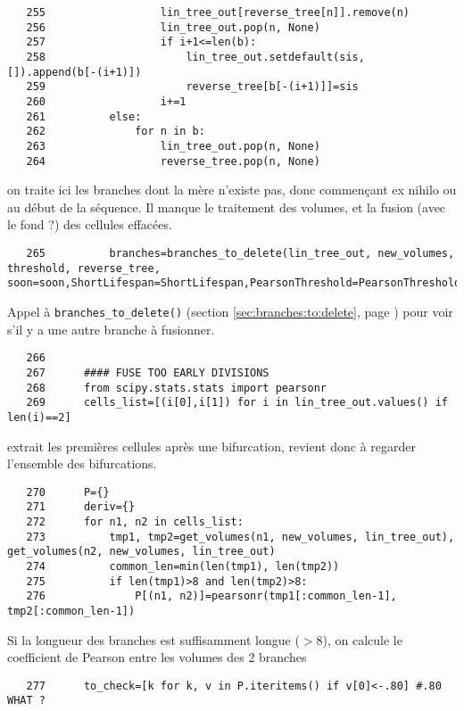 \documentclass{article}
\def \mycolor {red}
\begin{document}
\color{black}
\begin{verbatim}
   255	                lin_tree_out[reverse_tree[n]].remove(n)
   256	                lin_tree_out.pop(n, None)
   257	                if i+1<=len(b):
   258	                    lin_tree_out.setdefault(sis, []).append(b[-(i+1)])
   259	                    reverse_tree[b[-(i+1)]]=sis
   260	                i+=1
   261	        else:
   262	            for n in b:
   263	                lin_tree_out.pop(n, None)
   264	                reverse_tree.pop(n, None)
\end{verbatim} 
\color{\mycolor}
on traite ici les branches dont la m\`ere n'existe pas, donc commen\c{c}ant ex nihilo ou au d\'ebut de la s\'equence. Il manque le traitement des volumes, et la fusion (avec le fond ?) des cellules effac\'ees.
\color{black}
\begin{verbatim}
   265	        branches=branches_to_delete(lin_tree_out, new_volumes, threshold, reverse_tree, soon=soon,ShortLifespan=ShortLifespan,PearsonThreshold=PearsonThreshold,time_begin=time_begin,time_end=time_end)
\end{verbatim} 
\color{\mycolor}
Appel \`a \texttt{branches\_to\_delete()}
(section \ref{sec:branches:to:delete}, page \pageref{sec:branches:to:delete}) pour voir s'il y a une autre branche \`a fusionner.
\color{black}
\begin{verbatim}
   266	
   267	    #### FUSE TOO EARLY DIVISIONS
   268	    from scipy.stats.stats import pearsonr
   269	    cells_list=[(i[0],i[1]) for i in lin_tree_out.values() if len(i)==2]
\end{verbatim} 
\color{\mycolor}
extrait les premi\`eres cellules apr\`es une bifurcation, revient donc \`a regarder l'ensemble des bifurcations.
\color{black}
\begin{verbatim}
   270	    P={}
   271	    deriv={}
   272	    for n1, n2 in cells_list:
   273	        tmp1, tmp2=get_volumes(n1, new_volumes, lin_tree_out), get_volumes(n2, new_volumes, lin_tree_out)
   274	        common_len=min(len(tmp1), len(tmp2))
   275	        if len(tmp1)>8 and len(tmp2)>8: 
   276	            P[(n1, n2)]=pearsonr(tmp1[:common_len-1], tmp2[:common_len-1])
\end{verbatim} 
\color{\mycolor}
Si la longueur des branches est suffisamment longue ($>8$), on calcule le coefficient de Pearson entre les volumes des 2 branches 
\color{black}
\begin{verbatim}
   277	    to_check=[k for k, v in P.iteritems() if v[0]<-.80] #.80 WHAT ? 
\end{verbatim} 
\end{document}
